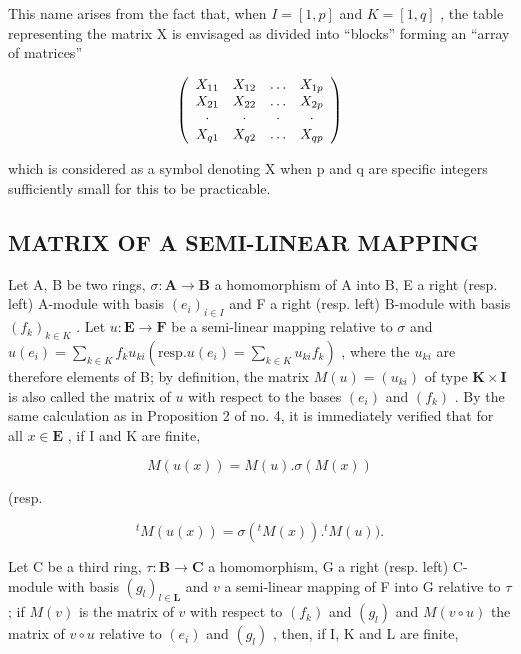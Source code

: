 This name arises from the fact that, when \(I = [1, p]\) and \(K = [1, q]\) , the table representing the matrix X is envisaged as divided into ``blocks'' forming an ``array of matrices''

\[
\left( \begin{array}{c c c c} X _ {1 1} & X _ {1 2} & \ldots & X _ {1 p} \\ X _ {2 1} & X _ {2 2} & \ldots & X _ {2 p} \\ \cdot & \cdot & \cdot & \cdot \\ X _ {q 1} & X _ {q 2} & \ldots & X _ {q p} \end{array} \right)
\]

which is considered as a symbol denoting X when p and q are specific integers sufficiently small for this to be practicable.

\subsection{MATRIX OF A SEMI-LINEAR MAPPING}

Let A, B be two rings, \(\sigma: \mathbf{A} \to \mathbf{B}\) a homomorphism of A into B, E a right (resp. left) A-module with basis \((e_i)_{i \in I}\) and F a right (resp. left) B-module with basis \((f_k)_{k\in K}\) . Let \(u:\mathbf{E}\to \mathbf{F}\) be a semi-linear mapping relative to \(\sigma\) and \(u(e_i) = \sum_{k\in K}f_ku_{ki}\left(\text{resp.} u(e_i) = \sum_{k\in K}u_{ki}f_k\right)\) , where the \(u_{ki}\) are therefore elements of B; by definition, the matrix \(M(u) = (u_{ki})\) of type \(\mathbf{K}\times \mathbf{I}\) is also called the matrix of \(u\) with respect to the bases \((e_i)\) and \((f_k)\) . By the same calculation as in Proposition 2 of no. 4, it is immediately verified that for all \(x\in \mathbf{E}\) , if I and K are finite,

\[
M (u (x)) = M (u). \sigma (M (x))\tag{26 D}
\]

(resp.

\[
{ } ^ { t } M ( u ( x ) ) = \sigma ( { } ^ { t } M ( x ) ) . { } ^ { t } M ( u ) ) .\tag{26 G}
\]

Let C be a third ring, \(\tau: \mathbf{B} \to \mathbf{C}\) a homomorphism, G a right (resp. left) C-module with basis \((g_l)_{l \in \mathbf{L}}\) and \(v\) a semi-linear mapping of F into G relative to \(\tau\) ; if \(M(v)\) is the matrix of \(v\) with respect to \((f_k)\) and \((g_l)\) and \(M(v \circ u)\) the matrix of \(v \circ u\) relative to \((e_i)\) and \((g_l)\) , then, if I, K and L are finite,

